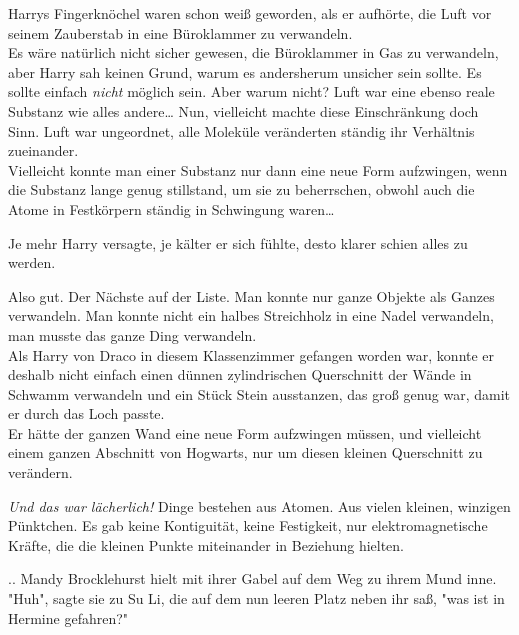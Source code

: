 {Harrys Fingerknöchel waren schon weiß geworden, als er aufhörte, die Luft vor seinem Zauberstab in eine Büroklammer zu verwandeln.\\ Es wäre natürlich nicht sicher gewesen, die Büroklammer in Gas zu verwandeln, aber Harry sah keinen Grund, warum es andersherum unsicher sein sollte. Es sollte einfach \emph{nicht} möglich sein. Aber warum nicht? Luft war eine ebenso reale Substanz wie alles andere… Nun, vielleicht machte diese Einschränkung doch Sinn. Luft war ungeordnet, alle Moleküle veränderten ständig ihr Verhältnis zueinander.\\ Vielleicht konnte man einer Substanz nur dann eine neue Form aufzwingen, wenn die Substanz lange genug stillstand, um sie zu beherrschen, obwohl auch die Atome in Festkörpern ständig in Schwingung waren…

Je mehr Harry versagte, je kälter er sich fühlte, desto klarer schien alles zu werden.

Also gut. Der Nächste auf der Liste. Man konnte nur ganze Objekte als Ganzes verwandeln. Man konnte nicht ein halbes Streichholz in eine Nadel verwandeln, man musste das ganze Ding verwandeln.\\ Als Harry von Draco in diesem Klassenzimmer gefangen worden war, konnte er deshalb nicht einfach einen dünnen zylindrischen Querschnitt der Wände in Schwamm verwandeln und ein Stück Stein ausstanzen, das groß genug war, damit er durch das Loch passte.\\ Er hätte der ganzen Wand eine neue Form aufzwingen müssen, und vielleicht einem ganzen Abschnitt von Hogwarts, nur um diesen kleinen Querschnitt zu verändern.

\emph{Und das war lächerlich!} Dinge bestehen aus Atomen. Aus vielen kleinen, winzigen Pünktchen. Es gab keine Kontiguität, keine Festigkeit, nur elektromagnetische Kräfte, die die kleinen Punkte miteinander in Beziehung hielten.

.. Mandy Brocklehurst hielt mit ihrer Gabel auf dem Weg zu ihrem Mund inne. "Huh", sagte sie zu Su Li, die auf dem nun leeren Platz neben ihr saß, "was ist in Hermine gefahren?"

}
